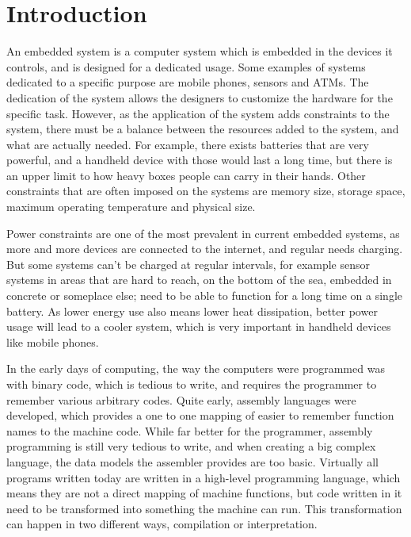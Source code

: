 \chapter{Introduction}
An embedded system is a computer system which is embedded in the devices it controls, and is designed for a dedicated usage.
Some examples of systems dedicated to a specific purpose are mobile phones, sensors and ATMs.
The dedication of the system allows the designers to customize the hardware for the specific task.
However, as the application of the system adds constraints to the system, there must be a balance between the resources added to the system, and what are actually needed.
For example, there exists batteries that are very powerful, and a handheld device with those would last a long time, but there is an upper limit to how heavy boxes people can carry in their hands.
Other constraints that are often imposed on the systems are memory size, storage space, maximum operating temperature and physical size.

Power constraints are one of the most prevalent in current embedded systems, as more and more devices are connected to the internet, and regular needs charging.
But some systems can’t be charged at regular intervals, for example sensor systems in areas that are hard to reach, on the bottom of the sea, embedded in concrete or someplace else; need to be able to function for a long time on a single battery.
As lower energy use also means lower heat dissipation, better power usage will lead to a cooler system, which is very important in handheld devices like mobile phones. 

In the early days of computing, the way the computers were programmed was with binary code, which is tedious to write, and requires the programmer to remember various arbitrary codes. 
Quite early, assembly languages were developed, which provides a one to one mapping of easier to remember function names to the machine code.
While far better for the programmer, assembly programming is still very tedious to write, and when creating a big complex language, the data models the assembler provides are too basic. 
Virtually all programs written today are written in a high-level programming language, which means they are not a direct mapping of machine functions, but code written in it need to be transformed into something the machine can run. 
This transformation can happen in two different ways, compilation or interpretation. 

